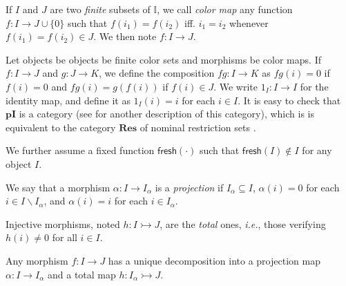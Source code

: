 \documentclass[english]{PaperTools/latex/lipics}
\def\pI{\ensuremath{\mathbf{pI}}}
\def\fresh#1{\mathsf{fresh}(#1)}
\def\ie{\textit{i.e.}}
\begin{document}
\begin{definition}
  If $I$ and $J$ are two \emph{finite} subsets of $𝕀$, we call
  \emph{color map} any function $f : I → J ∪ \{0\}$ such that
  $f(i_1) = f(i_2)$ iff. $i_1 = i_2$ whenever $f(i_1) = f(i_2) ∈ J$.
  We then note $f : I → J$.
\end{definition}

\begin{definition}[Category $\pI{}$]
  \label{def:pI}
  Let objects be objects be finite color sets and morphisms be color maps.
  If $f : I → J$ and $g : J → K$, we define the composition $fg : I → K$
  as $fg(i) = 0$ if $f(i) = 0$ and $fg(i) = g(f(i))$ if $f(i) ∈ J$.
  We write $1_I : I → I$ for the identity map, and define it as $1_I(i) = i$ for each $i ∈ I$.
  It is easy to check that \pI{} is a category (see \cite[ex.~9.7
  p.~176]{PittsAM:nomsns} for another description of this category),
  which is is equivalent to the category $\mathbf{Res}$ of nominal
  restriction sets \cite[rem.~9.9 p.~161]{PittsAM:nomsns}.

  We further assume a fixed function $\fresh{·}$ such that
  $\fresh{I} ∉ I$ for any object $I$.
\end{definition}

\begin{definition}[Projection]
   We say that a morphism $α : I → I_α$ is a \emph{projection} if
   $I_α ⊆ I$,
   $α(i) = 0$ for each $i ∈ I \backslash I_α$, and
   $α(i) = i$ for each $i ∈ I_α$.
\end{definition}
\begin{definition}
  Injective morphisms, noted $h : I ↣ J$, are the \emph{total} ones, \ie,
  those verifying $h(i) ≠ 0$ for all $i ∈ I$.
\end{definition}
\begin{remark}
  Any morphism $f : I → J$ has a
  unique decomposition into a projection map
  $α : I → I_α$ and a total map $h : I_α ↣ J$.
\end{remark}
\end{document}
